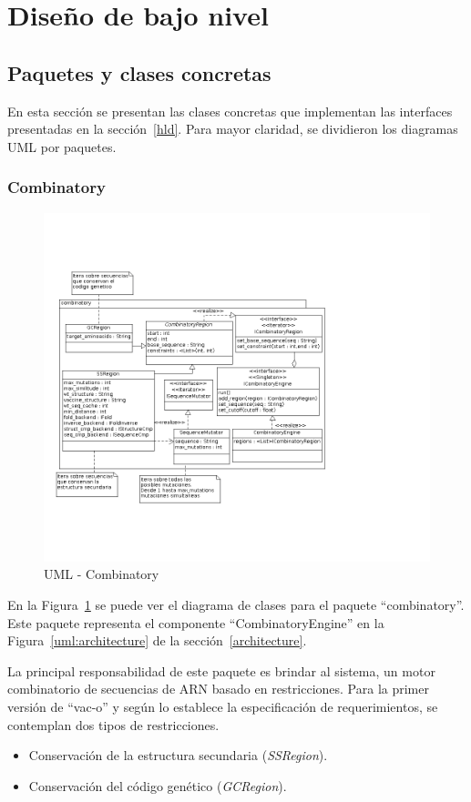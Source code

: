 \section{Dise\~no de bajo nivel}
\label{lld}  
  \subsection{Paquetes y clases concretas}
  En esta secci\'on se presentan las clases concretas que implementan las
interfaces presentadas en la secci\'on~\ref{hld}. Para mayor claridad, se
dividieron los diagramas UML por paquetes.

  \subsubsection{Combinatory}   
    \begin{figure}
      \centering
      \includegraphics[scale=0.5]{lld-combinatory.png}  
      \caption{UML - Combinatory}
      \label{uml:lld-combinatory}
    \end{figure}

  En la Figura~\ref{uml:lld-combinatory} se puede ver el diagrama de clases
para el paquete ``combinatory''. Este paquete representa el componente
``CombinatoryEngine'' en la Figura~\ref{uml:architecture} de la
secci\'on~\ref{architecture}.

  La principal responsabilidad de este paquete es brindar al sistema, un motor
combinatorio de secuencias de ARN basado en restricciones. Para la primer
versi\'on de ``vac-o'' y seg\'un lo establece la especificaci\'on de
requerimientos, se contemplan dos tipos de restricciones.
  \begin{itemize}
   \item Conservaci\'on de la estructura secundaria (\textit{SSRegion}).
   \item Conservaci\'on del c\'odigo gen\'etico (\textit{GCRegion}).
  \end{itemize}

